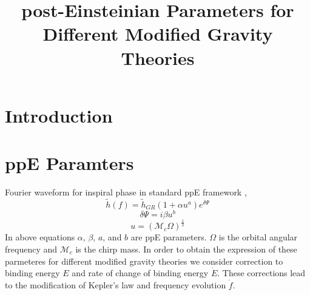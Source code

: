 \documentclass[11pt]{article}
\begin{document}
\title{post-Einsteinian Parameters for Different Modified Gravity Theories}
\maketitle
\section{Introduction}

\section{ppE Paramters}
\hspace*{15.5pt}Fourier waveform for inspiral phase in standard ppE framework \cite{Yunes:2009ke},
\begin{equation}\label{eq:1}
\tilde{h}(f)=\tilde{h}_{GR}(1+\alpha u^a)e^{\delta\Psi}
\end{equation}
\begin{equation}\label{eq:2}
\delta\Psi=i\beta u^b
\end{equation}
\begin{equation}
u=(\mathcal{M}_c \Omega)^\frac{1}{3}
\end{equation}
\hspace*{20pt}In above equations $\alpha$, $\beta$, $a$, and $b$ are ppE parameters. $\Omega$ is the orbital angular frequency and $\mathcal{M}_c$ is the chirp mass. In order to obtain the expression of these parmeteres for different modified gravity theories we consider correction to binding energy $E$ and rate of change of binding energy $\dot{E}$. These corrections lead to the modification of Kepler's law and frequency evolution $\dot{f}$.\\
\end{document}
